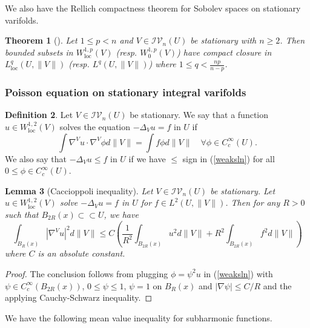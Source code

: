 \documentclass[11pt]{amsart}
\newtheorem{theorem}{Theorem}[section]
\newtheorem{lemma}[theorem]{Lemma}
\theoremstyle{definition}
\newtheorem{definition}[theorem]{Definition}
\newcommand{\IV}{\mathcal{IV}}
\newcommand{\loc}{\mathrm{loc}}
\newcommand{\ssubset}{\subset\subset}
\DeclareMathOperator{\Div}{div}
\begin{document}
We also have the Rellich compactness theorem for Sobolev spaces on stationary varifolds.
\begin{theorem}[{\cite[Theorem 7.11, 7.21]{Me1sobolev}}] \label{rellich.on.one.varifold}
	Let $1\le p<n$ and $V\in \IV_n(U)$ be stationary with $n\ge 2$. Then bounded subsets in $W^{1,p}_\loc(V)$ (resp. $W^{1,p}_0(V)$) have compact closure in $L^q_\loc(U,\|V\|)$ (resp. $L^q(U,\|V\|)$) where $1\le q<\frac{np}{n-p}$.
\end{theorem}

\subsubsection{Poisson equation on stationary integral varifolds}\label{section.poisson.equation}
\begin{definition}
	Let $V\in \IV_n(U)$ be stationary. We say that a function $u\in W^{1,2}_\loc(V)$ solves the equation $-\Delta_V u=f$ in $U$ if 
	\begin{equation}\label{weaksln}
		\int \nabla^V u\cdot \nabla^V \phi d\|V\|=\int f\phi d\|V\|\quad \forall\phi\in C_c^\infty(U).
	\end{equation} 
	We also say that $-\Delta_V u\le f$ in $U$ if we have $\le$ sign in (\ref{weaksln}) for all  $0\le \phi\in C_c^\infty(U)$.
\end{definition}


\begin{lemma}[Caccioppoli inequality]\label{cac}
	Let $V\in \IV_n(U)$ be stationary. Let $u\in W^{1,2}_\loc(V)$ solve $-\Delta_V u=f$ in $U$ for $f\in L^2(U,\|V\|)$. 
	Then for any $R>0$ such that $ B_{2R}(x)\ssubset U$, we have
	\[\int_{B_R(x)} |\nabla^V u|^2d\|V\|\le C\left(\frac{1}{R^2}\int_{B_{2R}(x)}u^2d\|V\|+R^2\int_{B_{2R}(x)} f^2d\|V\|\right)\]
	where $C$ is an absolute constant.
\end{lemma}
\begin{proof}
	The conclusion follows from plugging $\phi=\psi^2u$ in (\ref{weaksln}) with $\psi\in C_c^\infty(B_{2R}(x))$, $0\le \psi\le 1$, $\psi=1$ on $B_R(x)$ and $|\nabla\psi|\le C/R$ and the applying Cauchy-Schwarz inequality.
\end{proof}
We have the following mean value inequality for subharmonic functions.
\end{document}
